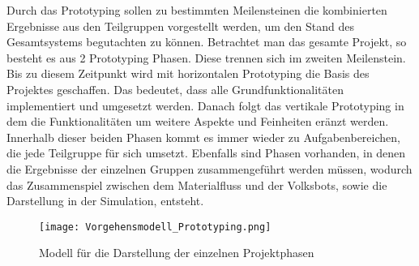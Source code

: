 Durch das Prototyping sollen zu bestimmten Meilensteinen die kombinierten Ergebnisse aus den Teilgruppen vorgestellt werden, um den Stand des Gesamtsystems begutachten zu k\"onnen. Betrachtet man das gesamte Projekt, so besteht es aus 2 Prototyping Phasen. Diese trennen sich im zweiten Meilenstein. Bis zu diesem Zeitpunkt wird mit horizontalen Prototyping die Basis des Projektes geschaffen. Das bedeutet, dass alle Grundfunktionalit\"aten implementiert und umgesetzt werden. Danach folgt das vertikale Prototyping in dem die Funktionalit\"aten um weitere Aspekte und Feinheiten er\"anzt werden. Innerhalb dieser beiden Phasen kommt es immer wieder zu Aufgabenbereichen, die jede Teilgruppe f\"ur sich umsetzt. Ebenfalls sind Phasen vorhanden, in denen die Ergebnisse der einzelnen Gruppen zusammengef\"uhrt werden m\"ussen, wodurch das Zusammenspiel zwischen dem Materialfluss und der Volksbots, sowie die Darstellung in der Simulation, entsteht.

	\begin{figure}[h!]
		\centering
			\texttt{[image: Vorgehensmodell\_Prototyping.png]}
			\caption{Modell für die Darstellung der einzelnen Projektphasen}
			\label{Vorgehensmodell_Prototyping}
	\end{figure}	
